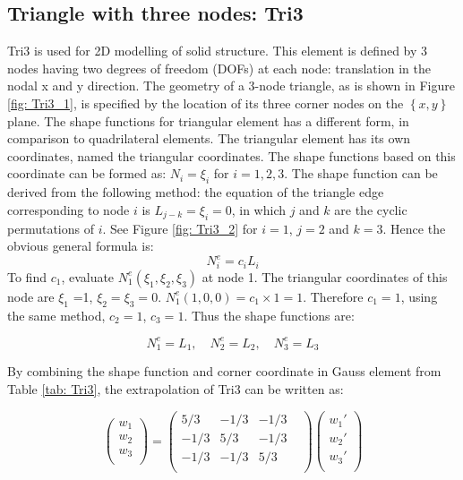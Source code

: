 \subsection{Triangle with three nodes: Tri3}
Tri3 is used for 2D modelling of solid structure. This element is defined by 3 nodes having two degrees of freedom (DOFs) at each node: translation in the nodal x and y direction. The geometry of a 3-node triangle, as is shown in Figure \ref{fig: Tri3_1}, is specified by the location of its three corner nodes on the $\left\{x, y\right\}$ plane. The shape functions for triangular element has a different form, in comparison to quadrilateral elements. The triangular element has its own coordinates, named the triangular coordinates. The shape functions based on this coordinate can be formed as: $N_i = \xi_i$ for $i = 1, 2, 3.$ The shape function can be derived from the following method: the equation of the triangle edge corresponding to node $i$ is $L_{j-k} = \xi_i = 0$, in which $j$ and $k$ are the cyclic permutations of $i$. See Figure \ref{fig: Tri3_2} for $i = 1$, $j=2$ and $k = 3$. Hence the obvious general formula is:
\begin{equation}
N_i^e = c_iL_i
\end{equation}
To find $c_1$, evaluate $N_1^e\left(\xi_1, \xi_2, \xi_3\right)$ at node 1. The triangular coordinates of this node are $\xi_1$ =1, $\xi_2 = \xi_3 = 0$.  $N_1^e\left(1,0,0\right) = c_1 \times 1 = 1$. Therefore $c_1 = 1$, using the same method, $c_2 = 1$, $c_3 = 1$. Thus the shape functions are:

\begin{equation}
N_1^e = L_1 , \quad N_2^e = L_2, \quad N_3^e = L_3
\end{equation}

By combining the shape function and corner coordinate in Gauss element from Table \ref{tab: Tri3}, the extrapolation of Tri3 can be written as:

\begin{equation}
\begin{pmatrix}
w_1 \\
w_2 \\
w_3 \\
\end{pmatrix} = \begin{pmatrix}
5/3 & -1/3 & -1/3 &    \\
-1/3 & 5/3 & -1/3 &    \\
-1/3 & -1/3 & 5/3 &    \\
\end{pmatrix} \begin{pmatrix}
{w_1}' \\
{w_2}' \\
{w_3}' \\
\end{pmatrix}
\end{equation}

